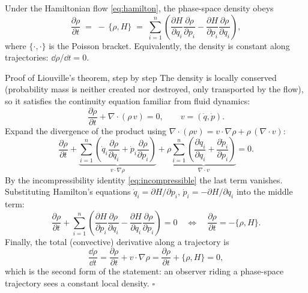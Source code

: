 \begin{theorem}[Liouville]\label{thm:liouville}
Under the Hamiltonian flow \eqref{eq:hamilton}, the phase-space density
obeys
\begin{equation}
  \frac{\partial \rho}{\partial t}
  \;=\; -\,\{\rho, H\}
  \;=\; \sum_{i=1}^n \left(
    \frac{\partial H}{\partial q_i}\frac{\partial \rho}{\partial p_i}
    - \frac{\partial H}{\partial p_i}\frac{\partial \rho}{\partial q_i}
  \right),
  \label{eq:liouville}
\end{equation}
where $\{\cdot,\cdot\}$ is the Poisson bracket. Equivalently, the density
is constant along trajectories: $\dd \rho / \dd t = 0$.
\end{theorem}

\begin{toolbox}{Proof of Liouville's theorem, step by step}
The density is locally conserved (probability mass is neither created nor
destroyed, only transported by the flow), so it satisfies the continuity
equation familiar from fluid dynamics:
\begin{equation*}
  \frac{\partial \rho}{\partial t} + \nabla \cdot (\rho\, v) = 0,
  \qquad v = (\dot q, \dot p).
\end{equation*}
Expand the divergence of the product using
$\nabla \cdot (\rho v) = v \cdot \nabla \rho + \rho\, (\nabla \cdot v)$:
\begin{equation*}
  \frac{\partial \rho}{\partial t}
  + \underbrace{\sum_{i=1}^n \left(
      \dot q_i \frac{\partial \rho}{\partial q_i}
      + \dot p_i \frac{\partial \rho}{\partial p_i}\right)}_{v \cdot \nabla \rho}
  + \rho \underbrace{\sum_{i=1}^n \left(
      \frac{\partial \dot q_i}{\partial q_i}
      + \frac{\partial \dot p_i}{\partial p_i}\right)}_{\nabla \cdot v}
  = 0 .
\end{equation*}
By the incompressibility identity \eqref{eq:incompressible} the last term
vanishes. Substituting Hamilton's equations
$\dot q_i = \partial H/\partial p_i$, $\dot p_i = -\partial H/\partial q_i$
into the middle term:
\begin{equation*}
  \frac{\partial \rho}{\partial t}
  + \sum_{i=1}^n \left(
      \frac{\partial H}{\partial p_i}\frac{\partial \rho}{\partial q_i}
      - \frac{\partial H}{\partial q_i}\frac{\partial \rho}{\partial p_i}
    \right) = 0
  \quad\Longleftrightarrow\quad
  \frac{\partial \rho}{\partial t} = -\{\rho, H\}.
\end{equation*}
Finally, the total (convective) derivative along a trajectory is
\begin{equation*}
  \frac{\dd \rho}{\dd t}
  = \frac{\partial \rho}{\partial t} + v \cdot \nabla \rho
  = \frac{\partial \rho}{\partial t} + \{\rho, H\}
  = 0 ,
\end{equation*}
which is the second form of the statement: an observer riding a
phase-space trajectory sees a constant local density. \hfill$\square$
\end{toolbox}

